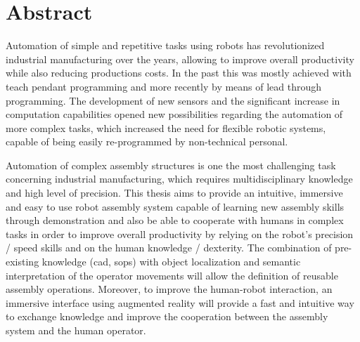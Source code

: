 \chapter*{Abstract}

Automation of simple and repetitive tasks using robots has revolutionized industrial manufacturing over the years, allowing to improve overall productivity while also reducing productions costs. In the past this was mostly achieved with teach pendant programming and more recently by means of lead through programming. The development of new sensors and the significant increase in computation capabilities opened new possibilities regarding the automation of more complex tasks, which increased the need for flexible robotic systems, capable of being easily re-programmed by non-technical personal.

Automation of complex assembly structures is one the most challenging task concerning industrial manufacturing, which requires multidisciplinary knowledge and high level of precision. This thesis aims to provide an intuitive, immersive and easy to use robot assembly system capable of learning new assembly skills through demonstration and also be able to cooperate with humans in complex tasks in order to improve overall productivity by relying on the robot's precision / speed skills and on the human knowledge / dexterity. The combination of pre-existing knowledge (\gls{cad}, \glspl{sop}) with object localization and semantic interpretation of the operator movements will allow the definition of reusable assembly operations. Moreover, to improve the human-robot interaction, an immersive interface using augmented reality will provide a fast and intuitive way to exchange knowledge and improve the cooperation between the assembly system and the human operator.
